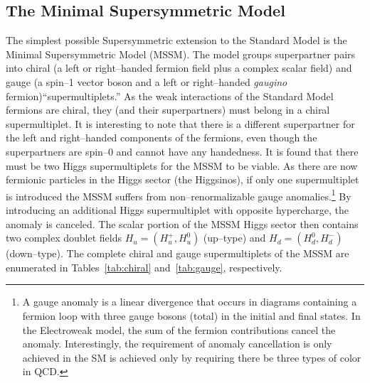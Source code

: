 \subsection{The Minimal Supersymmetric Model}
\label{sec:MSSMAndTaus} The simplest possible Supersymmetric extension to the
Standard Model is the Minimal Supersymmetric Model (MSSM).  The model groups
superpartner pairs into chiral (a left or right--handed fermion field plus a
complex scalar field) and gauge (a spin--1 vector boson and a left or
right--handed \emph{gaugino} fermion)``supermultiplets.''  As the weak
interactions of the Standard Model fermions are chiral, they (and their
superpartners) must belong in a chiral supermultiplet.  It is interesting to
note that there is a different superpartner for the left and right--handed
components of the fermions, even though the superpartners are spin--0 and cannot
have any handedness. It is found that there must be two Higgs supermultiplets
for the MSSM to be viable.  As there are now fermionic particles in the Higgs
sector (the Higgsinos), if only one supermultiplet is introduced the MSSM suffers
from non--renormalizable gauge anomalies.\footnote{A gauge anomaly is a linear
divergence that occurs in diagrams containing a fermion loop with three gauge
bosons (total) in the initial and final states.  In the Electroweak model, the
sum of the fermion contributions cancel the anomaly.  Interestingly, the
requirement of anomaly cancellation is only achieved in the SM is achieved only
by requiring there be three types of color in QCD.}  By introducing an
additional Higgs supermultiplet with opposite hypercharge, the anomaly is
canceled. The scalar portion of the MSSM Higgs sector then contains two complex
doublet fields $H_u = (H^+_u, H^0_u)$ (up--type) and $H_d = (H^0_d, H^-_d)$
(down--type).  The complete chiral and gauge supermultiplets of the MSSM are
enumerated in Tables~\ref{tab:chiral} and~\ref{tab:gauge}, respectively.
\renewcommand{\arraystretch}{1.4}
